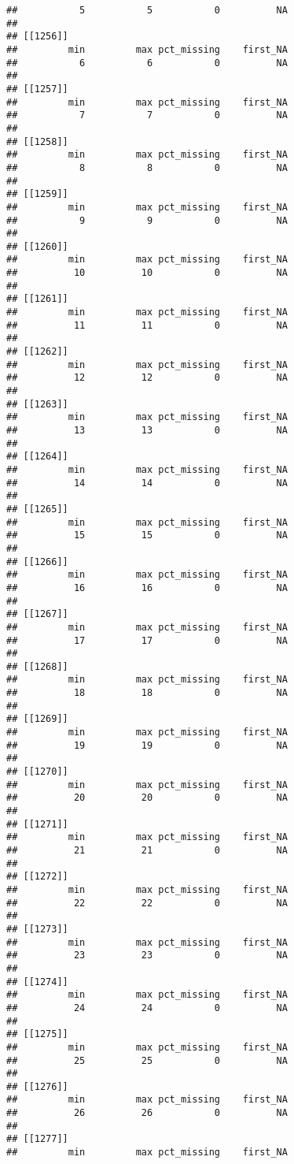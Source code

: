 \documentclass[
]{article}
\begin{document}
\begin{verbatim}
##           5           5           0          NA 
## 
## [[1256]]
##         min         max pct_missing    first_NA 
##           6           6           0          NA 
## 
## [[1257]]
##         min         max pct_missing    first_NA 
##           7           7           0          NA 
## 
## [[1258]]
##         min         max pct_missing    first_NA 
##           8           8           0          NA 
## 
## [[1259]]
##         min         max pct_missing    first_NA 
##           9           9           0          NA 
## 
## [[1260]]
##         min         max pct_missing    first_NA 
##          10          10           0          NA 
## 
## [[1261]]
##         min         max pct_missing    first_NA 
##          11          11           0          NA 
## 
## [[1262]]
##         min         max pct_missing    first_NA 
##          12          12           0          NA 
## 
## [[1263]]
##         min         max pct_missing    first_NA 
##          13          13           0          NA 
## 
## [[1264]]
##         min         max pct_missing    first_NA 
##          14          14           0          NA 
## 
## [[1265]]
##         min         max pct_missing    first_NA 
##          15          15           0          NA 
## 
## [[1266]]
##         min         max pct_missing    first_NA 
##          16          16           0          NA 
## 
## [[1267]]
##         min         max pct_missing    first_NA 
##          17          17           0          NA 
## 
## [[1268]]
##         min         max pct_missing    first_NA 
##          18          18           0          NA 
## 
## [[1269]]
##         min         max pct_missing    first_NA 
##          19          19           0          NA 
## 
## [[1270]]
##         min         max pct_missing    first_NA 
##          20          20           0          NA 
## 
## [[1271]]
##         min         max pct_missing    first_NA 
##          21          21           0          NA 
## 
## [[1272]]
##         min         max pct_missing    first_NA 
##          22          22           0          NA 
## 
## [[1273]]
##         min         max pct_missing    first_NA 
##          23          23           0          NA 
## 
## [[1274]]
##         min         max pct_missing    first_NA 
##          24          24           0          NA 
## 
## [[1275]]
##         min         max pct_missing    first_NA 
##          25          25           0          NA 
## 
## [[1276]]
##         min         max pct_missing    first_NA 
##          26          26           0          NA 
## 
## [[1277]]
##         min         max pct_missing    first_NA 

\end{verbatim}
\end{document}
